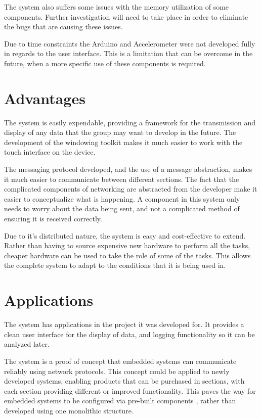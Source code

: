 The system also suffers some issues with the memory utilization of some components. Further investigation will need to take place in order to eliminate the bugs that are causing these issues.

Due to time constraints the Arduino and Accelerometer were not developed fully in regards to the user interface. This is a limitation that can be overcome in the future, when a more specific use of these components is required.

\section{Advantages}

The system is easily expendable, providing a framework for the transmission and display of any data that the group may want to develop in the future. The development of the windowing toolkit makes it much easier to work with the touch interface on the device. 

The messaging protocol developed, and the use of a message abstraction, makes it much easier to communicate between different sections. The fact that the complicated components of networking are abstracted from the developer make it easier to conceptualize what is happening. A component in this system only needs to worry about the data being sent, and not a complicated method of ensuring it is received correctly.

Due to it's distributed nature, the system is easy and cost-effective to extend. Rather than having to source expensive new hardware to perform all the tasks, cheaper hardware can be used to take the role of some of the tasks. This allows the complete system to adapt to the conditions that it is being used in.

\section{Applications}

The system has applications in the project it was developed for. It provides a clean user interface for the display of data, and logging functionality so it can be analyzed later.

The system is a proof of concept that embedded systems can communicate reliably using network protocols. This concept could be applied to newly developed systems, enabling products that can be purchased in sections, with each section providing different or improved functionality. This paves the way for embedded systems to be configured via pre-built components , rather than developed using one monolithic structure. 

